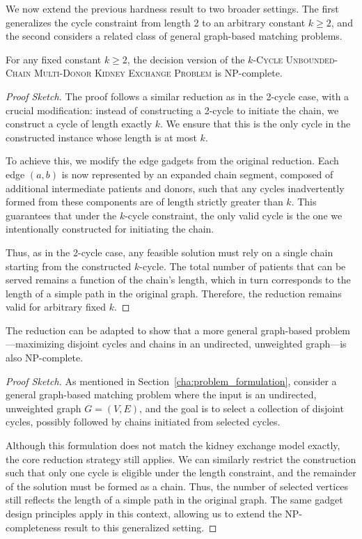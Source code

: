 We now extend the previous hardness result to two broader settings. The first generalizes the cycle constraint from length 2 to an arbitrary constant $k \ge 2$, and the second considers a related class of general graph-based matching problems.

\begin{lemma}
For any fixed constant $k \ge 2$, the decision version of the \textsc{$k$-Cycle Unbounded-Chain Multi-Donor Kidney Exchange Problem} is NP-complete.
\end{lemma}

\begin{proof}[Proof Sketch]
The proof follows a similar reduction as in the 2-cycle case, with a crucial modification: instead of constructing a 2-cycle to initiate the chain, we construct a cycle of length exactly $k$. We ensure that this is the only cycle in the constructed instance whose length is at most $k$.

To achieve this, we modify the edge gadgets from the original reduction. Each edge $(a, b)$ is now represented by an expanded chain segment, composed of additional intermediate patients and donors, such that any cycles inadvertently formed from these components are of length strictly greater than $k$. This guarantees that under the $k$-cycle constraint, the only valid cycle is the one we intentionally constructed for initiating the chain.

Thus, as in the 2-cycle case, any feasible solution must rely on a single chain starting from the constructed $k$-cycle. The total number of patients that can be served remains a function of the chain's length, which in turn corresponds to the length of a simple path in the original graph. Therefore, the reduction remains valid for arbitrary fixed $k$.
\end{proof}

\begin{lemma}
The reduction can be adapted to show that a more general graph-based problem—maximizing disjoint cycles and chains in an undirected, unweighted graph—is also NP-complete.
\end{lemma}

\begin{proof}[Proof Sketch]
As mentioned in Section~\ref{cha:problem_formulation}, consider a general graph-based matching problem where the input is an undirected, unweighted graph $G = (V, E)$, and the goal is to select a collection of disjoint cycles, possibly followed by chains initiated from selected cycles.

Although this formulation does not match the kidney exchange model exactly, the core reduction strategy still applies. We can similarly restrict the construction such that only one cycle is eligible under the length constraint, and the remainder of the solution must be formed as a chain. Thus, the number of selected vertices still reflects the length of a simple path in the original graph. The same gadget design principles apply in this context, allowing us to extend the NP-completeness result to this generalized setting.
\end{proof}





